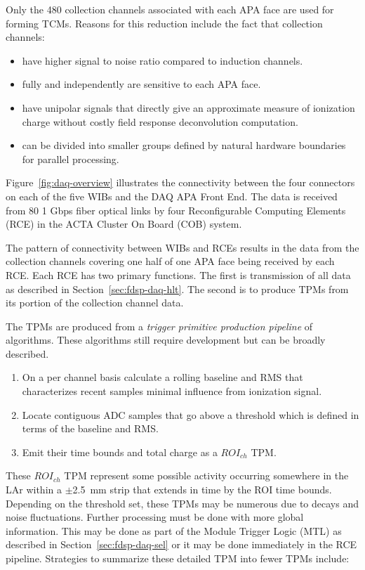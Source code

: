 Only the 480 collection channels associated with each APA face are
used for forming TCMs.  Reasons for this reduction include the fact
that collection channels:

\begin{itemize}
\item have higher signal to noise ratio compared to induction channels.
\item fully and independently are sensitive to each APA face.
\item have unipolar signals that directly give an approximate measure
  of ionization charge without costly field response deconvolution
  computation.
\item can be divided into smaller groups defined by natural hardware
  boundaries for parallel processing.
\end{itemize}


Figure~\ref{fig:daq-overview} illustrates the connectivity between the
four connectors on each of the five WIBs and the DAQ APA Front End.
The data is received from 80 1 Gbps fiber optical links by four
Reconfigurable Computing Elements (RCE) in the ACTA Cluster On Board
(COB) system. 

The pattern of connectivity between WIBs and RCEs results in the data
from the collection channels covering one half of one APA face being
received by each RCE.  Each RCE has two primary functions.  The first
is transmission of all data as described in
Section~\ref{sec:fdsp-daq-hlt}.  The second is to produce TPMs from
its portion of the collection channel data.

The TPMs are produced from a \textit{trigger primitive production
  pipeline} of algorithms.  These algorithms still require development
but can be broadly described.   

\begin{enumerate}
\item On a per channel basis calculate a rolling baseline and RMS that
  characterizes recent samples minimal influence from ionization
  signal.
\item Locate contiguous ADC samples that go above a threshold which is
  defined in terms of the baseline and RMS.
\item Emit their time bounds and total charge as a $ROI_{ch}$ TPM.
\end{enumerate}

These $ROI_{ch}$ TPM represent some possible activity occurring
somewhere in the LAr within a $\pm$\SI{2.5}{\mm} strip that extends in
time by the ROI time bounds.  Depending on the threshold set, these
TPMs may be numerous due to  decays and noise fluctuations.
Further processing must be done with more global information.  This
may be done as part of the Module Trigger Logic (MTL) as described in
Section~\ref{sec:fdsp-daq-sel} or it may be done immediately in the
RCE pipeline.  Strategies to summarize these detailed TPM into fewer
TPMs include:

